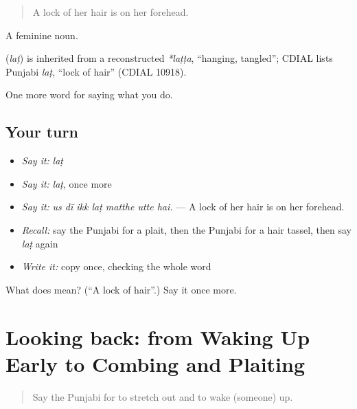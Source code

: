 \begin{quote}
A lock of her hair is on her forehead.
\end{quote}

A feminine noun.

\begin{cousinweb}
\textbf{} (\emph{laṭ}) is inherited from a reconstructed \emph{*laṭṭa}, \textquotedblleft{}hanging, tangled\textquotedblright{}; CDIAL lists Punjabi \emph{laṭ}, \textquotedblleft{}lock of hair\textquotedblright{} (CDIAL 10918).
\end{cousinweb}

\begin{grammarlens}[title={What you've built}]
One more word for saying what you do.
\end{grammarlens}

\subsection*{Your turn}
\begin{itemize}
\raggedright
  \item \emph{Say it:} \emph{laṭ}
  \item \emph{Say it:} \emph{laṭ}, once more
  \item \emph{Say it:} \emph{us dī ikk laṭ matthe utte hai.} — A lock of her hair is on her forehead.
  \item \emph{Recall:} say the Punjabi for a plait, then the Punjabi for a hair tassel, then say \emph{laṭ} again
  \item \emph{Write it:} copy \textbf{} once, checking the whole word
\end{itemize}

\begin{tcolorbox}[breakable,colback=teal!4,colframe=teal!35!black,title={Before you move on}]
What does  mean? (\textquotedblleft{}A lock of hair\textquotedblright{}.) Say it once more.
\end{tcolorbox}
\section[(dialogue)]{Looking back: from Waking Up Early to Combing and Plaiting}

\label{lesson:PA-R231-review-225-231}



\begin{quote}
Say the Punjabi for to stretch out and to wake (someone) up.
\end{quote}

